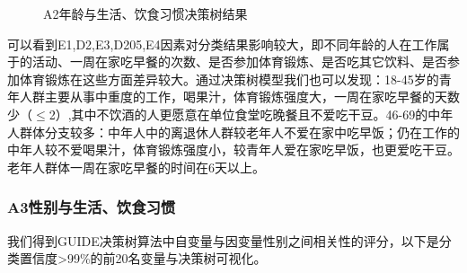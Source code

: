 \documentclass{article}
\numberwithin{equation}{subsection}
\begin{document}
\begin{figure}[htbp]
{    }
    \quad
    \caption{A2年龄与生活、饮食习惯决策树结果}
\end{figure}

可以看到E1,D2,E3,D205,E4因素对分类结果影响较大，即不同年龄的人在工作属于的活动、一周在家吃早餐的次数、是否参加体育锻炼、是否吃其它饮料、是否参加体育锻炼在这些方面差异较大。通过决策树模型我们也可以发现：18-45岁的青年人群主要从事中重度的工作，喝果汁，体育锻炼强度大，一周在家吃早餐的天数少（$\leq$2）,其中不饮酒的人更愿意在单位食堂吃晚餐且不爱吃干豆。46-69的中年人群体分支较多：中年人中的离退休人群较老年人不爱在家中吃早饭；仍在工作的中年人较不爱喝果汁，体育锻炼强度小，较青年人爱在家吃早饭，也更爱吃干豆。老年人群体一周在家吃早餐的时间在6天以上。
\subsubsection{A3性别与生活、饮食习惯}
我们得到GUIDE决策树算法中自变量与因变量性别之间相关性的评分，以下是分类置信度>99\%的前20名变量与决策树可视化。
\end{document}
